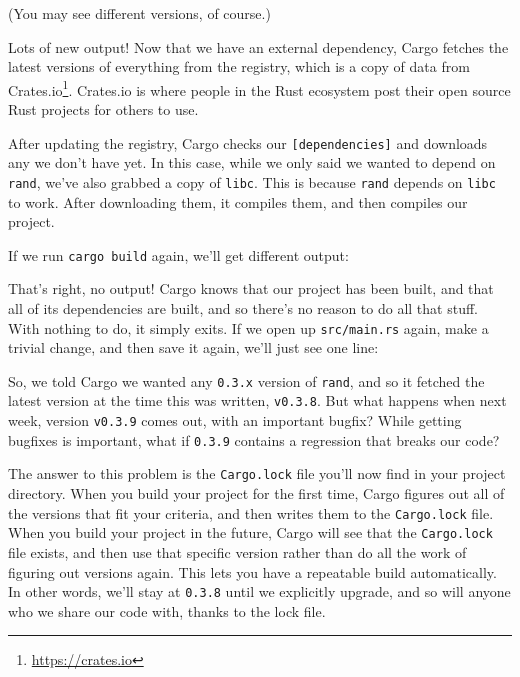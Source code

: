 \documentclass[a4paper,]{book}
\newenvironment{Shaded}{\begin{snugshade}}{\end{snugshade}}
\newcommand{\KeywordTok}[1]{\textcolor[rgb]{0.13,0.29,0.53}{\textbf{{#1}}}}
\newcommand{\NormalTok}[1]{{#1}}
\renewcommand{\href}[2]{#2\footnote{\url{#1}}}
\begin{document}
(You may see different versions, of course.)

Lots of new output! Now that we have an external dependency, Cargo
fetches the latest versions of everything from the registry, which is a
copy of data from \href{https://crates.io}{Crates.io}. Crates.io is
where people in the Rust ecosystem post their open source Rust projects
for others to use.

After updating the registry, Cargo checks our
\texttt{{[}dependencies{]}} and downloads any we don't have yet. In this
case, while we only said we wanted to depend on \texttt{rand}, we've
also grabbed a copy of \texttt{libc}. This is because \texttt{rand}
depends on \texttt{libc} to work. After downloading them, it compiles
them, and then compiles our project.

If we run \texttt{cargo\ build} again, we'll get different output:

\begin{Shaded}
\end{Shaded}

That's right, no output! Cargo knows that our project has been built,
and that all of its dependencies are built, and so there's no reason to
do all that stuff. With nothing to do, it simply exits. If we open up
\texttt{src/main.rs} again, make a trivial change, and then save it
again, we'll just see one line:

\begin{Shaded}
\end{Shaded}

So, we told Cargo we wanted any \texttt{0.3.x} version of \texttt{rand},
and so it fetched the latest version at the time this was written,
\texttt{v0.3.8}. But what happens when next week, version
\texttt{v0.3.9} comes out, with an important bugfix? While getting
bugfixes is important, what if \texttt{0.3.9} contains a regression that
breaks our code?

The answer to this problem is the \texttt{Cargo.lock} file you'll now
find in your project directory. When you build your project for the
first time, Cargo figures out all of the versions that fit your
criteria, and then writes them to the \texttt{Cargo.lock} file. When you
build your project in the future, Cargo will see that the
\texttt{Cargo.lock} file exists, and then use that specific version
rather than do all the work of figuring out versions again. This lets
you have a repeatable build automatically. In other words, we'll stay at
\texttt{0.3.8} until we explicitly upgrade, and so will anyone who we
share our code with, thanks to the lock file.
\end{document}
